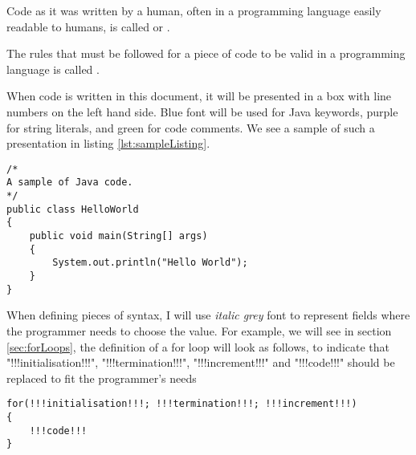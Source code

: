 \documentclass[11pt]{article}
\begin{document}
\begin{defi}
    Code as it was written by a human, often in a programming language easily readable to humans, is called  or .
\end{defi}
\begin{defi}[Syntax]
    The rules that must be followed for a piece of code to be valid in a programming language is called .
\end{defi}
\noindent When code is written in this document, it will be presented in a box with line numbers on the left hand side. {\color{blue} Blue} font will be used for Java keywords, {\color{mymauve} purple} for string literals, and {\color{mygreen} green} for code comments. We see a sample of such a presentation in listing \ref{lst:sampleListing}.
\pagebreak
\vspace{-15pt}
\begin{lstlisting}[caption=A sample of code, label=lst:sampleListing]
/*
A sample of Java code.
*/
public class HelloWorld
{
    public void main(String[] args)
    {
        System.out.println("Hello World");
    }
} 
\end{lstlisting}
When defining pieces of syntax, I will use {\slshape\color{mygray} italic grey} font to represent fields where the programmer needs to choose the value. For example, we will see in section \ref{sec:forLoops}, the definition of a for loop will look as follows, to indicate that \inlineJava"!!!initialisation!!!", \inlineJava"!!!termination!!!", \inlineJava"!!!increment!!!" and \inlineJava"!!!code!!!" should be replaced to fit the programmer's needs
\vspace{-20pt}
\begin{lstlisting}[style=javaSyntax]
for(!!!initialisation!!!; !!!termination!!!; !!!increment!!!)
{
    !!!code!!!
}
\end{lstlisting}
\end{document}

